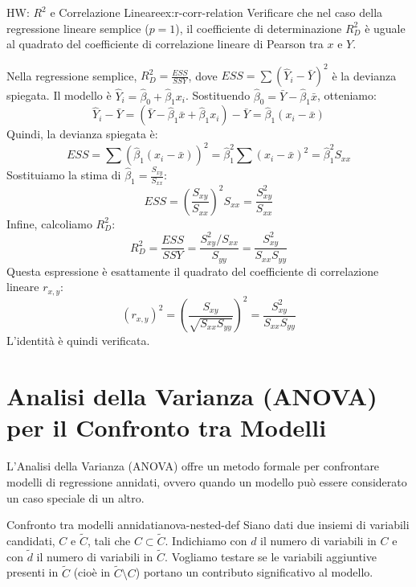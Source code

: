 \begin{esercizio}{HW: \(R^2\) e Correlazione Lineare}{ex:r-corr-relation}
Verificare che nel caso della regressione lineare semplice (\(p=1\)), il
coefficiente di determinazione \(R_D^2\) è uguale al quadrato del coefficiente
di correlazione lineare di Pearson tra \(x\) e \(Y\).
\begin{dimostrazione}{}{}
Nella regressione semplice, \(R_D^2 = \frac{ESS}{SSY}\), dove \(ESS =
\sum(\hat{Y}_i - \bar{Y})^2\) è la devianza spiegata.
Il modello è \(\hat{Y}_i = \hat{\beta}_0 + \hat{\beta}_1 x_i\). Sostituendo
\(\hat{\beta}_0 = \bar{Y} - \hat{\beta}_1 \bar{x}\), otteniamo:
\[
    \hat{Y}_i - \bar{Y} = (\bar{Y} - \hat{\beta}_1 \bar{x} + \hat{\beta}_1 x_i)
    - \bar{Y} = \hat{\beta}_1 (x_i - \bar{x})
\]
Quindi, la devianza spiegata è:
\[
    ESS = \sum (\hat{\beta}_1 (x_i - \bar{x}))^2 = \hat{\beta}_1^2 \sum (x_i -
    \bar{x})^2 = \hat{\beta}_1^2 S_{xx}
\]
Sostituiamo la stima di \(\hat{\beta}_1 = \frac{S_{xy}}{S_{xx}}\):
\[
    ESS = \left(\frac{S_{xy}}{S_{xx}}\right)^2 S_{xx} = \frac{S_{xy}^2}{S_{xx}}
\]
Infine, calcoliamo \(R_D^2\):
\[
    R_D^2 = \frac{ESS}{SSY} = \frac{S_{xy}^2 / S_{xx}}{S_{yy}} =
    \frac{S_{xy}^2}{S_{xx} S_{yy}}
\]
Questa espressione è esattamente il quadrato del coefficiente di correlazione
lineare \(r_{x,y}\):
\[
    (r_{x,y})^2 = \left(\frac{S_{xy}}{\sqrt{S_{xx} S_{yy}}}\right)^2 =
    \frac{S_{xy}^2}{S_{xx} S_{yy}}
\]
L'identità è quindi verificata.
\end{dimostrazione}
\end{esercizio}



\section{Analisi della Varianza (ANOVA) per il Confronto tra Modelli}

L'Analisi della Varianza (ANOVA) offre un metodo formale per confrontare modelli
di regressione annidati, ovvero quando un modello può essere considerato un
caso speciale di un altro.

\begin{definizione}{Confronto tra modelli annidati}{anova-nested-def}
Siano dati due insiemi di variabili candidati, \(C\) e \(\tilde{C}\), tali che
\(C \subset \tilde{C}\). Indichiamo con \(d\) il numero di variabili in \(C\) e
con \(\tilde{d}\) il numero di variabili in \(\tilde{C}\). Vogliamo testare se
le variabili aggiuntive presenti in \(\tilde{C}\) (cioè in \(\tilde{C}
\setminus C\)) portano un contributo significativo al modello.
\end{definizione}

